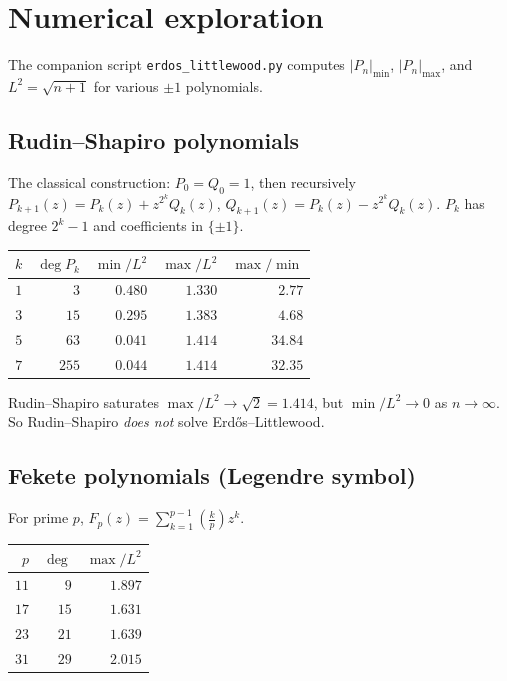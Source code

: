 \documentclass[11pt,a4paper]{article}
\begin{document}
\section{Numerical exploration}\label{sec:numerics}

The companion script \texttt{erdos\_littlewood.py} computes
$|P_n|_{\min}$, $|P_n|_{\max}$, and $L^2 = \sqrt{n+1}$ for various $\pm 1$
polynomials.

\subsection{Rudin--Shapiro polynomials}

The classical construction: $P_0 = Q_0 = 1$, then recursively
$P_{k+1}(z) = P_k(z) + z^{2^k} Q_k(z)$, $Q_{k+1}(z) = P_k(z) - z^{2^k} Q_k(z)$.
$P_k$ has degree $2^k - 1$ and coefficients in $\{\pm 1\}$.

\begin{center}
\begin{tabular}{rrrrr}
\toprule
$k$ & $\deg P_k$ & $\min/L^2$ & $\max/L^2$ & $\max/\min$ \\
\midrule
$1$ & $3$  & $0.480$ & $1.330$ & $2.77$ \\
$3$ & $15$ & $0.295$ & $1.383$ & $4.68$ \\
$5$ & $63$ & $0.041$ & $1.414$ & $34.84$ \\
$7$ & $255$ & $0.044$ & $1.414$ & $32.35$ \\
\bottomrule
\end{tabular}
\end{center}

Rudin--Shapiro saturates $\max/L^2 \to \sqrt{2} = 1.414$, but $\min/L^2 \to 0$
as $n \to \infty$. So Rudin--Shapiro \emph{does not} solve Erd\H{o}s--Littlewood.

\subsection{Fekete polynomials (Legendre symbol)}
For prime $p$, $F_p(z) = \sum_{k=1}^{p-1} \left(\frac{k}{p}\right) z^k$.

\begin{center}
\begin{tabular}{rrr}
\toprule
$p$ & $\deg$ & $\max/L^2$ \\
\midrule
$11$ & $9$ & $1.897$ \\
$17$ & $15$ & $1.631$ \\
$23$ & $21$ & $1.639$ \\
$31$ & $29$ & $2.015$ \\
\bottomrule
\end{tabular}
\end{center}
\end{document}

